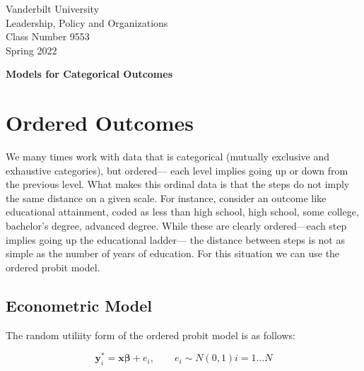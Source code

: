 \documentclass[12 pt]{article}
\begin{document}
\newcommand{\boldbeta}{\boldsymbol{\beta}}
\newcommand{\boldy}{\boldsymbol{y}}
\newcommand{\boldX}{\boldsymbol{X}}
\newcommand{\boldx}{\boldsymbol{x}}
\newcommand{\boldz}{\boldsymbol{z}}
\newcommand{\boldgamma}{\boldsymbol{\gamma}}
\newcommand{\boldeps}{\boldsymbol{\epsilon}}


\setlength{\parskip}{1ex plus 0.5ex minus 0.2ex}

\setcounter{secnumdepth}{-2}


\begin{flushleft}
  

Vanderbilt University \\
Leadership, Policy and Organizations \\
Class Number 9553 \\
Spring 2022 \\
\end{flushleft}

\begin{centering}
\textbf{\large{Models for Categorical Outcomes}}  
\end{centering}


\section{Ordered Outcomes}

We many times work with data that is categorical (mutually exclusive and exhaustive
categories), but ordered--- each level implies going up or down from the previous level.
What makes this ordinal data is that the steps do not imply the same distance on a
given scale. For instance, consider an outcome like educational attainment, coded as
less than high school, high school, some college, bachelor's degree, advanced degree.
While these are clearly ordered---each step implies going up the educational ladder---
the distance between steps is not as simple as the number of years of education.
For this situation we can use the ordered probit model. 

\subsection{Econometric Model}
\label{sec:econometric-model}

The random  utiliity form of the ordered probit model is as follows:

\begin{equation*}
  \boldy^*_i=\boldx \boldbeta + e_i, \qquad e_i  \sim N (0,1)   i=1  \ldots N
\end{equation*}
\end{document}
